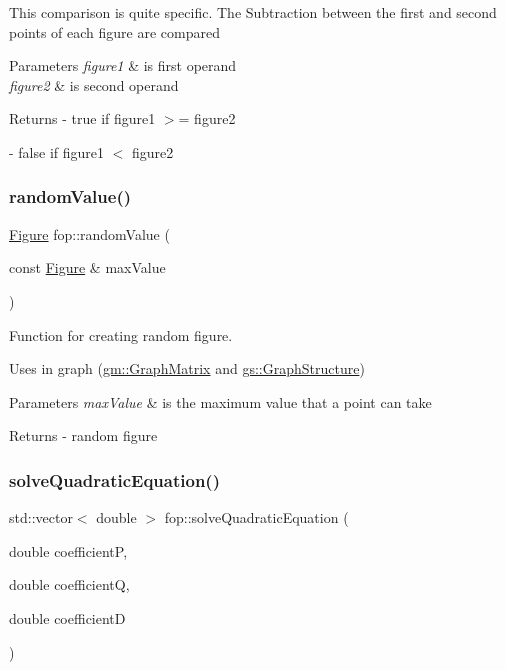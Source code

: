 This comparison is quite specific. The Subtraction between the first and second points of each figure are compared 
\begin{DoxyParams}{Parameters}
{\em figure1} & is first operand \\
\hline
{\em figure2} & is second operand \\
\hline
\end{DoxyParams}
\begin{DoxyReturn}{Returns}
-\/ true if \textquotesingle{}figure1\textquotesingle{} $>$= \textquotesingle{}figure2\textquotesingle{} 

-\/ false if \textquotesingle{}figure1\textquotesingle{} $<$ \textquotesingle{}figure2\textquotesingle{} 
\end{DoxyReturn}
\mbox{\label{namespacefop_af4426fe719704633a3129439207583ce}} 
\subsubsection{\texorpdfstring{random\+Value()}{randomValue()}}
{\footnotesize\ttfamily \mbox{\hyperlink{classfop_1_1_figure}{Figure}} fop\+::random\+Value (\begin{DoxyParamCaption}\item[{const \mbox{\hyperlink{classfop_1_1_figure}{Figure}} \&}]{max\+Value }\end{DoxyParamCaption})}



Function for creating random figure. 

Uses in graph (\mbox{\hyperlink{classgm_1_1_graph_matrix}{gm\+::\+Graph\+Matrix}} and \mbox{\hyperlink{classgs_1_1_graph_structure}{gs\+::\+Graph\+Structure}}) 
\begin{DoxyParams}{Parameters}
{\em max\+Value} & is the maximum value that a point can take \\
\hline
\end{DoxyParams}
\begin{DoxyReturn}{Returns}
-\/ random figure 
\end{DoxyReturn}
\mbox{\label{namespacefop_a28077bc23913a5e5f1522e7fbb13bcfe}} 
\subsubsection{\texorpdfstring{solve\+Quadratic\+Equation()}{solveQuadraticEquation()}}
{\footnotesize\ttfamily std\+::vector$<$ double $>$ fop\+::solve\+Quadratic\+Equation (\begin{DoxyParamCaption}\item[{double}]{coefficientP,  }\item[{double}]{coefficientQ,  }\item[{double}]{coefficientD }\end{DoxyParamCaption})}



